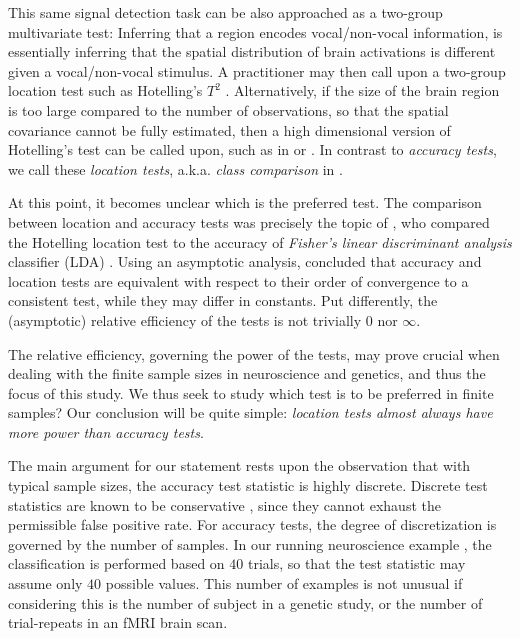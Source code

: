 \documentclass[12pt,a4paper]{article}
\begin{document}
This same signal detection task can be also approached as a two-group multivariate test:
Inferring that a region encodes vocal/non-vocal information, is essentially inferring that the spatial distribution of brain activations is different given a vocal/non-vocal stimulus. 
A practitioner may then call upon a two-group location test such as Hotelling's $T^2$ \citep{fujikoshi_multivariate_2011}.
Alternatively, if the size of the brain region is too large compared to the number of observations, so that the spatial covariance cannot be fully estimated, then a high dimensional version of Hotelling's test can be called upon, such as in \cite{srivastava_testing_2013} or \cite{schafer_shrinkage_2005}.
In contrast to \emph{accuracy tests}, we call these \emph{location tests}, a.k.a. \emph{class comparison} in \cite{simon_pitfalls_2003}.

At this point, it becomes unclear which is the preferred test. 
The comparison between location and accuracy tests was precisely the topic of \cite{ramdas_classification_2016}, who compared the Hotelling location test to the accuracy of \emph{Fisher's linear discriminant analysis} classifier (LDA) \citep{hastie_elements_2003-1}. 
Using an asymptotic analysis, \cite{ramdas_classification_2016} concluded that accuracy and location tests are equivalent with respect to their order of convergence to a consistent test, while they may differ in constants. 
Put differently, the (asymptotic) relative efficiency of the tests is not trivially $0$ nor $\infty$.

The relative efficiency, governing the power of the tests, may prove crucial when dealing with the finite sample sizes in neuroscience and genetics, and thus the focus of this study. 
We thus seek to study which test is to be preferred in finite samples? 
Our conclusion will be quite simple: {\em location tests almost always have more power than accuracy tests}.

The main argument for our statement rests upon the observation that with typical sample sizes, the accuracy test statistic is highly discrete. 
Discrete test statistics are known to be conservative \citep{hemerik_exact_2014-1}, since they cannot exhaust the permissible false positive rate. 
For accuracy tests, the degree of discretization is governed by the number of samples. 
In our running neuroscience example \citep{gilron_quantifying_2016}, the classification is performed based on $40$ trials, so that the test statistic may assume only $40$ possible values. 
This number of examples is not unusual if considering this is the number of subject in a genetic study, or the number of trial-repeats in an fMRI brain scan. 
\end{document}
